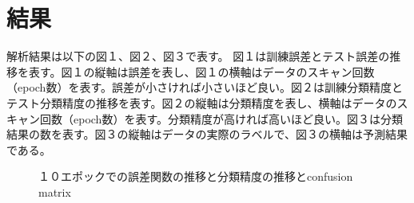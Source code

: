\documentclass{jarticle}
\begin{document}
\section{結果}
解析結果は以下の図１、図２、図３で表す。
図１は訓練誤差とテスト誤差の推移を表す。図１の縦軸は誤差を表し、図１の横軸はデータのスキャン回数（epoch数）を表す。誤差が小さければ小さいほど良い。図２は訓練分類精度とテスト分類精度の推移を表す。図２の縦軸は分類精度を表し、横軸はデータのスキャン回数（epoch数）を表す。分類精度が高ければ高いほど良い。図３は分類結果の数を表す。図３の縦軸はデータの実際のラベルで、図３の横軸は予測結果である。
\begin{figure}[h]
\centering
{}%
\qquad
{}%
\qquad
{}%
\caption{１０エポックでの誤差関数の推移と分類精度の推移とconfusion matrix}%
\label{fig:example}%
\end{figure}
\end{document}
